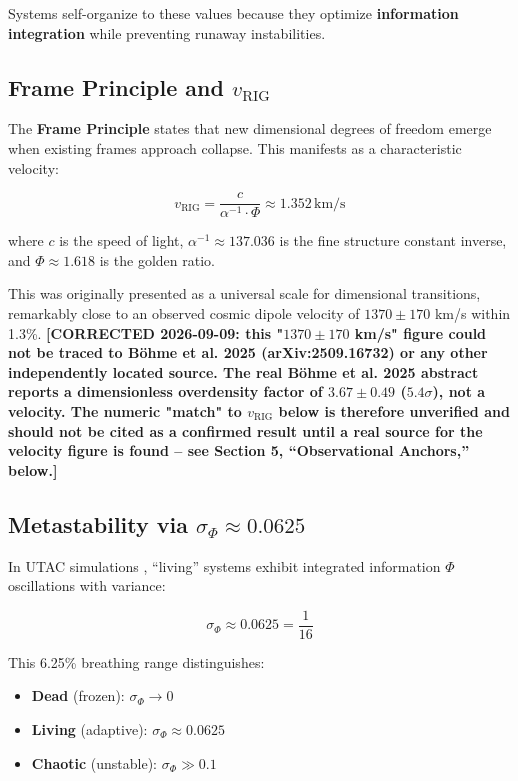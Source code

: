 \documentclass[11pt,a4paper,twocolumn]{article}
\begin{document}
Systems self-organize to these values because they optimize \textbf{information integration} while preventing runaway instabilities.

\subsection{Frame Principle and $v_{\text{RIG}}$}

The \textbf{Frame Principle} \citep{romer2025vrig} states that new dimensional degrees of freedom emerge when existing frames approach collapse. This manifests as a characteristic velocity:

\begin{equation}
v_{\text{RIG}} = \frac{c}{\alpha^{-1} \cdot \Phi} \approx 1.352 \, \text{km/s}
\end{equation}

where $c$ is the speed of light, $\alpha^{-1} \approx 137.036$ is the fine structure constant inverse, and $\Phi \approx 1.618$ is the golden ratio.

This was originally presented as a universal scale for dimensional transitions, remarkably close to an observed cosmic dipole velocity of $1370 \pm 170$ km/s within 1.3\%. \textbf{[CORRECTED 2026-09-09: this "$1370 \pm 170$ km/s" figure could not be traced to Böhme et al. 2025 (arXiv:2509.16732) or any other independently located source. The real Böhme et al. 2025 abstract reports a dimensionless overdensity factor of $3.67 \pm 0.49$ ($5.4\sigma$), not a velocity. The numeric "match" to $v_{\text{RIG}}$ below is therefore unverified and should not be cited as a confirmed result until a real source for the velocity figure is found -- see Section 5, ``Observational Anchors,'' below.]}

\subsection{Metastability via $\sigma_\Phi \approx 0.0625$}

In UTAC simulations \citep{romer2025living}, ``living'' systems exhibit integrated information $\Phi$ oscillations with variance:

\begin{equation}
\sigma_\Phi \approx 0.0625 = \frac{1}{16}
\end{equation}

This 6.25\% breathing range distinguishes:
\begin{itemize}
    \item \textbf{Dead} (frozen): $\sigma_\Phi \to 0$
    \item \textbf{Living} (adaptive): $\sigma_\Phi \approx 0.0625$
    \item \textbf{Chaotic} (unstable): $\sigma_\Phi \gg 0.1$
\end{itemize}
\end{document}
